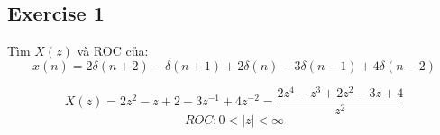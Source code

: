 \subsection{Exercise 1}
Tìm $X(z)$ và ROC của:
\[
x(n) = 2\delta(n+2) - \delta(n+1) + 2\delta(n) - 3\delta(n-1) + 4\delta(n-2)
\]

\[
X(z) = 2z^2 - z + 2 - 3z^{-1} + 4z^{-2} = \frac{2z^4 - z^3 + 2z^2 - 3z + 4}{z^2}
\]
\[
ROC: 0 < |z| < \infty
\]